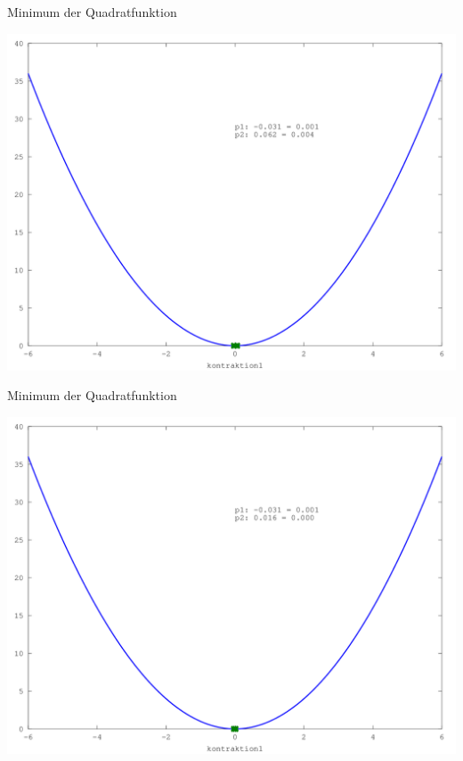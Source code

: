 \documentclass[\outputformat]{beamer}
\begin{document}
\begin{frame}{Minimum der Quadratfunktion}
	\begin{center}
		\includegraphics[height=0.75\paperheight]{../bilder/Quadrat/sinx_x008.png}
	\end{center}
\end{frame}
\begin{frame}{Minimum der Quadratfunktion}
	\begin{center}
		\includegraphics[height=0.75\paperheight]{../bilder/Quadrat/sinx_x009.png}
	\end{center}
\end{frame}
\end{document}
